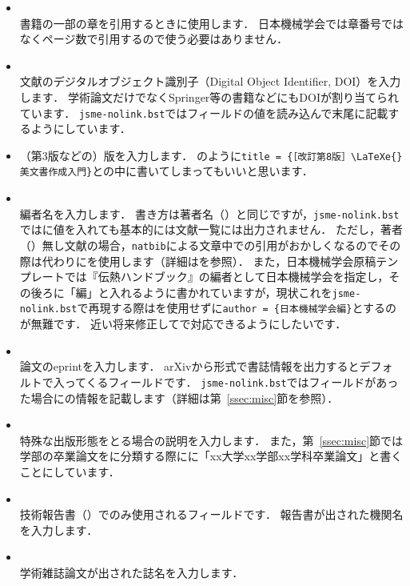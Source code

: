 \documentclass[a4paper,fleqn,uplatex,dvipdfmx]{jsarticle}
\newcommand{\jsmefile}{\texttt{jsme-nolink.bst}}
\begin{document}
\begin{itemize}
    \item \ttchapter \\
        書籍の一部の章を引用するときに使用します．
        日本機械学会では章番号ではなくページ数で引用するので使う必要はありません．
    \item \ttdoi \\
        文献のデジタルオブジェクト識別子（Digital Object Identifier, DOI）を入力します．
        学術論文だけでなくSpringer等の書籍などにもDOIが割り当てられています．
        \jsmefile では\ttdoi フィールドの値を読み込んで末尾に記載するようにしています．
    \item \ttedition
        （第3版などの）版を入力します．
        \citet{奥村:技評2020}のように\verb|title = {［改訂第8版］\LaTeXe{}美文書作成入門}|と\tttitle の中に書いてしまってもいいと思います．
    \item \tteditor \\
        編者名を入力します．
        書き方は著者名（\ttauthor）と同じですが，\jsmefile では\tteditor に値を入れても基本的には文献一覧には出力されません．
        ただし，著者（\ttauthor）無し文献の場合，\verb|natbib|による文章中での引用がおかしくなるのでその際は\ttauthor 代わりに\tteditor を使用します（詳細は\ttproceedings を参照）．
        また，日本機械学会原稿テンプレートでは『伝熱ハンドブック』の編者として日本機械学会を指定し，その後ろに「編」と入れるように書かれていますが，現状これを\jsmefile で再現する際は\tteditor を使用せずに\verb|author = {日本機械学会編}|とするのが無難です．
        近い将来修正して\tteditor で対応できるようにしたいです．
    \item \tteprint \\
        論文のeprintを入力します．
        arXivから\BibTeX{}形式で書誌情報を出力するとデフォルトで入ってくるフィールドです．
        \jsmefile では\ttarchivePrefix フィールドがあった場合に\tteprint の情報を記載します（詳細は第~\ref{ssec:misc}節\ttmisc を参照）．
    \item \tthowpublished \\
        特殊な出版形態をとる場合の説明を入力します．
        また，第~\ref{ssec:misc}節では学部の卒業論文を\ttmisc に分類する際に\tthowpublished に「xx大学xx学部xx学科卒業論文」と書くことにしています．
    \item \ttinstitution \\
        技術報告書（\tttechreport）でのみ使用されるフィールドです．
        報告書が出された機関名を入力します．
    \item \ttjournal \\
        学術雑誌論文が出された誌名を入力します．

\end{itemize}
\end{document}
